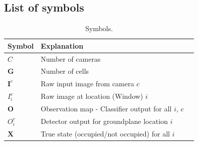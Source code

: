 \documentclass[10pt,twocolumn,letterpaper]{article}
\begin{document}





\subsection{List of symbols}
\begin{table}[ht]
  \begin{tabular}{lll}
   \hline
   Symbol & Explanation \\
   \hline
   $C $ & Number of cameras\\
   $\textbf{G} $ & Number of cells\\
   $ \textbf{I}^{c} $ & Raw input image from camera $ c$\\
   $ I_{i}^{c} $ & Raw image at location (Window) $ i$\\
   $ \textbf{O} $ & Observation map - Classifier output for all  $ i $, $ c $\\
   $O^{c}_{i} $& Detector output for groundplane location $ i $\\
   $\textbf{X}$& True state (occupied/not occupied) for all $i$\\
   \hline
  \end{tabular}
  \caption{%
    Symbols.
  }
  \label{tab:Formal symbols}
\end{table}
\end{document}
